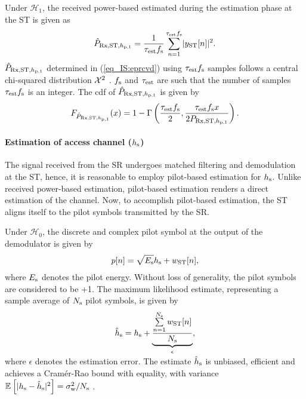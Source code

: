 Under $\mathcal H_1$, the received power-based estimated during the estimation phase at the ST is given as \cite{Urkowitz}
\begin{align}
\eprcvdstpt = \s{\test \fsam}{ |\yrcvd[n]|^2}.
\label{eq_IS:eprcvd} 
\end{align}
$\hat{P}_{\text{Rx,ST,$h_{\text{p,1}}$}}$ determined in (\ref{eq_IS:eprcvd}) using $\tau_{\text{est}} f_{\text{s}}$ samples follows a central chi-squared distribution $\cchi2$ \cite{Kay}. $f_{\text{s}}$ and $\tau_{\text{est}}$ are such that the number of samples $\tau_{\text{est}} f_{\text{s}}$ is an integer.
The cdf of $\hat{P}_{\text{Rx,ST,$h_{\text{p,1}}$}}$ is given by
\begin{align}
\feprcvdstpt(x) = 1 - \Gamma\left(\frac{\test \fsam}{2}, \frac{ \test \fsam x}{2 \prcvdstpt}  \right). 
\label{eq_IS:dprcvd}
\end{align}
\paragraph{Estimation of access channel ($h_{\text{s}}$)}
The signal received from the SR undergoes matched filtering and demodulation at the ST, hence, it is reasonable to employ pilot-based estimation for $h_{\text{s}}$. Unlike received power-based estimation, pilot-based estimation renders a direct estimation of the channel. Now, to accomplish pilot-based estimation, the ST aligns itself to the pilot symbols transmitted by the SR.

Under $\mathcal H_0$, the discrete and complex pilot symbol at the output of the demodulator is given by \cite{Gifford08}
\begin{align}
p[n] = \sqrt{E\sub{s}} \hs + \wst[n], 
\label{eq_IS:pilot_sig}
\end{align}
where $E_{\text{s}}$ denotes the pilot energy. Without loss of generality, the pilot symbols are considered to be +1. The maximum likelihood estimate, representing a sample average of $N_{\text{s}}$ pilot symbols, is given by \cite{Gifford05}
\begin{align}
\ehs = \hs + \smash[b]{\underbrace{\frac{\sum\limits^{\Ks}_{n=1} \wst[n]}{\Ks}}_{\epsilon}},
\label{eq_IS:pilot_MLE}
\end{align}\\[-0.00em]
where $\epsilon$ denotes the estimation error.
The estimate $\hat{h}_{\text{s}}$ is unbiased, efficient and achieves a Cram\'er-Rao bound with equality, with variance ${\mathbb E}_{}\left[ |h_{\text{s}} -\hat{h}_{\text{s}}|^2 \right] = \sigma^2_{\text{w}}/N_{\text{s}}$ \cite{Gifford08}.

